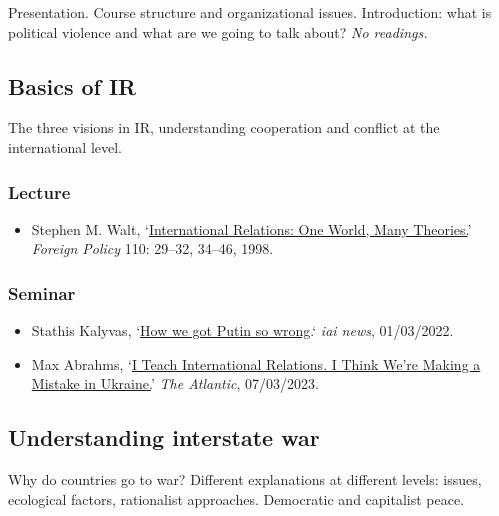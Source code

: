 \documentclass[12pt, a4paper]{article}
\begin{document}
Presentation. Course structure and organizational issues. Introduction: what is political violence and what are we going to talk about? \textit{No readings.}\\

\hline %

\subsection{Basics of IR}\label{ir_basics}

The three visions in IR, understanding cooperation and conflict at the international level.

\subsubsection*{Lecture}

\begin{itemize}
\setlength\itemsep{0pt}
\item Stephen M. Walt, `\href{https://doi.org/10.2307/1149275}{International Relations: One World, Many Theories.}' \textit{Foreign Policy} 110: 29--32, 34--46, 1998.
\end{itemize}

\subsubsection*{Seminar}

\begin{itemize}
  \item Stathis Kalyvas, `\href{https://iai.tv/articles/how-we-got-putin-so-wrong-auid-2063}{How we got Putin so wrong}.` \textit{iai news}, 01/03/2022.
  \item Max Abrahms, `\href{https://www.theatlantic.com/ideas/archive/2023/03/russia-ukraine-war-pundits-history-international-relations/673293/}{I Teach International Relations. I Think We’re Making a Mistake in Ukraine.}' \textit{The Atlantic}, 07/03/2023.
\end{itemize}

\hline %

\subsection{Understanding interstate war}\label{interstate}

Why do countries go to war? Different explanations at different levels: issues, ecological factors, rationalist approaches. Democratic and capitalist peace.
\end{document}
